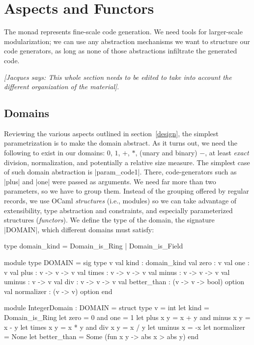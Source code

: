 \documentclass[draft]{elsart}
\newcommand{\jacques}[1]{{\it [Jacques says: #1]}}
\begin{document}
\section{Aspects and Functors}\label{functors}

The monad represents fine-scale code generation. We need tools for
larger-scale modularization; we can use any abstraction
mechanisms we want to structure our code generators, as long as none
of those abstractions infiltrate the generated code.


\jacques{This whole section needs to be edited to take into account
the different organization of the material}.

\subsection{Domains}
Reviewing the various aspects outlined in section~\ref{design}, the
simplest parametrization is to make the domain abstract.  As it turns
out, we need the following to exist in our domains: $0$, $1$, $+$,
$*$, (unary and binary) $-$, at least \emph{exact} division,
normalization, and potentially a relative size measure. The simplest
case of such domain abstraction is |param_code1|.  There,
code-generators such as |plus| and |one| were passed as arguments. We
need far more than two parameters, so we have to group them. Instead
of the grouping offered by regular records, we use OCaml
\emph{structures} (i.e., modules) so we can take advantage of
extensibility, type abstraction and constraints, and especially
parameterized structures (\emph{functors}).  We define the type of the
domain, the signature |DOMAIN|, which different domains must satisfy:

\begin{code}
type domain_kind = Domain_is_Ring | Domain_is_Field

module type DOMAIN = sig
  type v
  val kind : domain_kind
  val zero : v
  val one : v
  val plus : v -> v -> v
  val times : v -> v -> v
  val minus : v -> v -> v
  val uminus : v -> v
  val div : v -> v -> v
  val better_than : (v -> v -> bool) option
  val normalizer : (v -> v) option
end 

module IntegerDomain : DOMAIN = struct
    type v = int
    let kind = Domain_is_Ring
    let zero = 0 and one = 1
    let plus x y = x + y  and  minus x y = x - y
    let times x y = x * y and  div x y = x / y
    let uminus x = -x
    let normalizer = None
    let better_than = Some (fun x y -> abs x > abs y)
end
\end{code}
\end{document}
